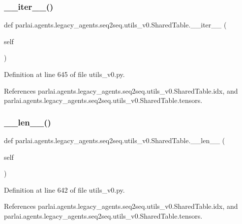 \subsubsection{\texorpdfstring{\+\_\+\+\_\+iter\+\_\+\+\_\+()}{\_\_iter\_\_()}}
{\footnotesize\ttfamily def parlai.\+agents.\+legacy\+\_\+agents.\+seq2seq.\+utils\+\_\+v0.\+Shared\+Table.\+\_\+\+\_\+iter\+\_\+\+\_\+ (\begin{DoxyParamCaption}\item[{}]{self }\end{DoxyParamCaption})}



Definition at line 645 of file utils\+\_\+v0.\+py.



References parlai.\+agents.\+legacy\+\_\+agents.\+seq2seq.\+utils\+\_\+v0.\+Shared\+Table.\+idx, and parlai.\+agents.\+legacy\+\_\+agents.\+seq2seq.\+utils\+\_\+v0.\+Shared\+Table.\+tensors.

\mbox{\label{classparlai_1_1agents_1_1legacy__agents_1_1seq2seq_1_1utils__v0_1_1SharedTable_ab4c44b0f04d00aff0f3d2908631a5a24}} 
\subsubsection{\texorpdfstring{\+\_\+\+\_\+len\+\_\+\+\_\+()}{\_\_len\_\_()}}
{\footnotesize\ttfamily def parlai.\+agents.\+legacy\+\_\+agents.\+seq2seq.\+utils\+\_\+v0.\+Shared\+Table.\+\_\+\+\_\+len\+\_\+\+\_\+ (\begin{DoxyParamCaption}\item[{}]{self }\end{DoxyParamCaption})}



Definition at line 642 of file utils\+\_\+v0.\+py.



References parlai.\+agents.\+legacy\+\_\+agents.\+seq2seq.\+utils\+\_\+v0.\+Shared\+Table.\+idx, and parlai.\+agents.\+legacy\+\_\+agents.\+seq2seq.\+utils\+\_\+v0.\+Shared\+Table.\+tensors.

